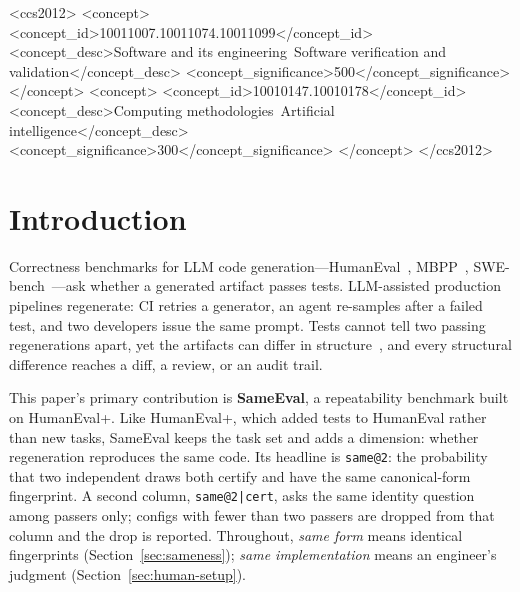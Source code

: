 \documentclass[acmsmall,screen,review,anonymous]{acmart}
\makeatletter
\newcommand{\sameeval}{SameEval}
\newcommand{\sameat}{\mbox{\texttt{same@2}}}
\newcommand{\sameatc}{\mbox{\texttt{same@2|cert}}}
\makeatother
\begin{document}
\begin{CCSXML}
<ccs2012>
<concept>
<concept_id>10011007.10011074.10011099</concept_id>
<concept_desc>Software and its engineering~Software verification and validation</concept_desc>
<concept_significance>500</concept_significance>
</concept>
<concept>
<concept_id>10010147.10010178</concept_id>
<concept_desc>Computing methodologies~Artificial intelligence</concept_desc>
<concept_significance>300</concept_significance>
</concept>
</ccs2012>
\end{CCSXML}



\maketitle

\section{Introduction}
\label{sec:intro}

Correctness benchmarks for LLM code generation---HumanEval~\cite{chen2021evaluating},
MBPP~\cite{austin2021program}, SWE-bench~\cite{jimenez2024swebench}---ask whether
a generated artifact passes tests.
LLM-assisted production pipelines regenerate: CI retries a generator, an agent re-samples
after a failed test, and two developers issue the same prompt.
Tests cannot tell two passing regenerations apart, yet the artifacts can
differ in structure~\cite{ouyang2023llm}, and every structural difference
reaches a diff, a review, or an audit trail.

This paper's primary contribution is \textbf{\sameeval{}}, a repeatability
benchmark built on HumanEval+.
Like HumanEval+, which added tests to HumanEval rather than new tasks,
\sameeval{} keeps the task set and adds a dimension: whether regeneration
reproduces the same code.
Its headline is \sameat{}: the probability that two independent draws
both certify and have the same canonical-form fingerprint.
A second column, \sameatc{}, asks the same identity question among passers
only; configs with fewer than two passers are dropped from that column and the
drop is reported.
Throughout, \emph{same form} means identical fingerprints
(Section~\ref{sec:sameness}); \emph{same implementation} means an engineer's
judgment (Section~\ref{sec:human-setup}).
\end{document}
